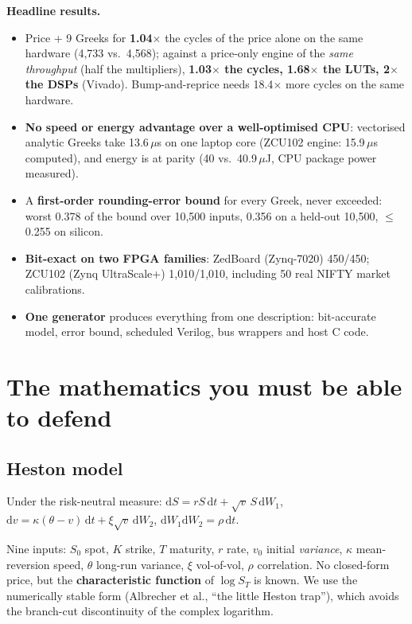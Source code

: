 \documentclass[11pt,a4paper]{article}
\begin{document}
\textbf{Headline results.}
\begin{itemize}
\item Price + 9 Greeks for \textbf{1.04$\times$} the cycles of the price alone on the same hardware
(4,733 vs.\ 4,568); against a price-only engine of the \emph{same throughput} (half the multipliers),
\textbf{1.03$\times$ the cycles, 1.68$\times$ the LUTs, 2$\times$ the DSPs} (Vivado). Bump-and-reprice needs
18.4$\times$ more cycles on the same hardware.
\item \textbf{No speed or energy advantage over a well-optimised CPU}: vectorised analytic Greeks take
13.6\,$\mu$s on one laptop core (ZCU102 engine: 15.9\,$\mu$s computed), and energy is at parity
(40 vs.\ 40.9\,$\mu$J, CPU package power measured).
\item A \textbf{first-order rounding-error bound} for every Greek, never exceeded: worst 0.378 of
the bound over 10,500 inputs, 0.356 on a held-out 10,500, $\le$ 0.255 on silicon.
\item \textbf{Bit-exact on two FPGA families}: ZedBoard (Zynq-7020) 450/450; ZCU102 (Zynq
UltraScale+) 1,010/1,010, including 50 real NIFTY market calibrations.
\item \textbf{One generator} produces everything from one description: bit-accurate model,
error bound, scheduled Verilog, bus wrappers and host C code.
\end{itemize}

\section{The mathematics you must be able to defend}
\subsection{Heston model}
Under the risk-neutral measure:
$\mathrm{d}S = rS\,\mathrm{d}t + \sqrt{v}\,S\,\mathrm{d}W_1$,\quad
$\mathrm{d}v = \kappa(\theta - v)\,\mathrm{d}t + \xi\sqrt{v}\,\mathrm{d}W_2$,\quad
$\mathrm{d}W_1\mathrm{d}W_2 = \rho\,\mathrm{d}t$.

Nine inputs: $S_0$ spot, $K$ strike, $T$ maturity, $r$ rate, $v_0$ initial \emph{variance},
$\kappa$ mean-reversion speed, $\theta$ long-run variance, $\xi$ vol-of-vol, $\rho$
correlation. No closed-form price, but the \textbf{characteristic function} of $\log S_T$ is
known. We use the numerically stable form (Albrecher et al., ``the little Heston trap''),
which avoids the branch-cut discontinuity of the complex logarithm.
\end{document}
